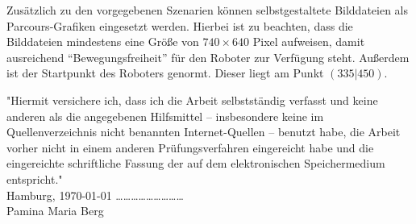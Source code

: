 \documentclass[paper=a4, DIV=calc, BCOR=12mm, twoside=on, onecolumn=on, open = right, titlepage =on, parskip =half-, headsepline = on, footsepline = off, chapterprefix = off, appendixprefix = on, fontsize = 12pt, numbers = noenddot, abstract = on]{scrbook}
\begin{document}

Zusätzlich zu den vorgegebenen Szenarien können selbstgestaltete Bilddateien als Parcours-Grafiken eingesetzt werden. Hierbei ist zu beachten, dass die Bilddateien mindestens eine Größe von $740 \times 640$ Pixel aufweisen, damit ausreichend "`Bewegungsfreiheit"' für den Roboter zur Verfügung steht. Außerdem ist der Startpunkt des Roboters genormt. Dieser liegt am Punkt $\left( 335 \vert 450 \right)$.

\cleardoublepage
\newpage
\thispagestyle{empty}
\vspace*{\fill}
"Hiermit versichere ich, dass ich die Arbeit selbstständig verfasst und keine anderen als die angegebenen Hilfsmittel – insbesondere keine im Quellenverzeichnis nicht benannten Internet-Quellen – benutzt habe, die Arbeit vorher nicht in einem anderen Prüfungsverfahren eingereicht habe und die eingereichte schriftliche Fassung der auf dem elektronischen Speichermedium entspricht."\\

Hamburg, \today \hspace*{\fill} \dots \dots \dots \dots \dots \dots \dots \dots \dots\\
\hspace*{\fill} Pamina Maria Berg \quad $\,$
\end{document}
